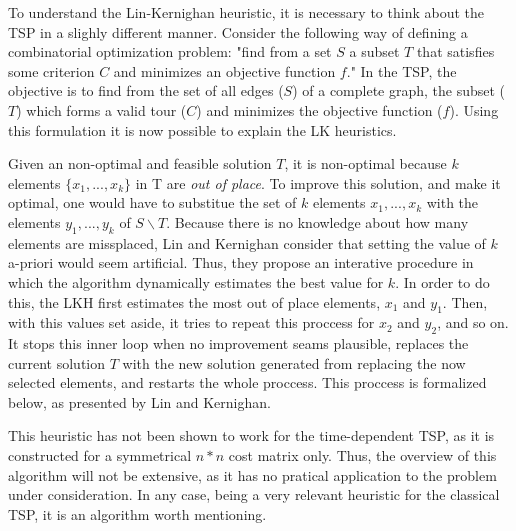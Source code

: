 To understand the Lin-Kernighan heuristic, it is necessary to think about the TSP in a slighly different manner.
Consider the following way of defining a combinatorial optimization problem: "find from a set
$S$ a subset $T$ that satisfies some criterion $C$ and minimizes an objective function $f$."
In the TSP, the objective is to find from the set of all edges ($S$) of a complete graph,
the subset ($T$) which forms a valid tour ($C$) and minimizes the objective function ($f$). 
Using this formulation it is now possible to explain the LK heuristics.

Given an non-optimal and feasible solution $T$, it is non-optimal because $k$ elements $\{x_1, ..., x_k\}$ in T are \textit{out of place}.
To improve this solution, and make it optimal, one would have to substitue the set of $k$ elements $x_1, ..., x_k$
with the elements $y_1, ..., y_k$ of $S \backslash T$. Because there is no knowledge about how many elements are missplaced,
Lin and Kernighan consider that setting the value of $k$ a-priori would seem artificial. 
Thus, they propose an interative procedure in which the algorithm dynamically estimates the best value for $k$.
In order to do this, the LKH first estimates the most out of place elements, $x_1$ and $y_1$. Then,
with this values set aside, it tries to repeat this proccess for $x_2$ and $y_2$, and so on. It stops this inner loop 
when no improvement seams plausible, replaces the current solution $T$ with the new solution generated from replacing the now selected elements,
and restarts the whole proccess. This proccess is formalized below, as presented by Lin and Kernighan.

This heuristic has not been shown to work for the time-dependent TSP, as it is constructed for a symmetrical $n*n$ cost matrix only.
Thus, the overview of this algorithm will not be extensive, as it has no pratical application to the problem under consideration.
In any case, being a very relevant heuristic for the classical TSP, it is an algorithm worth mentioning.


